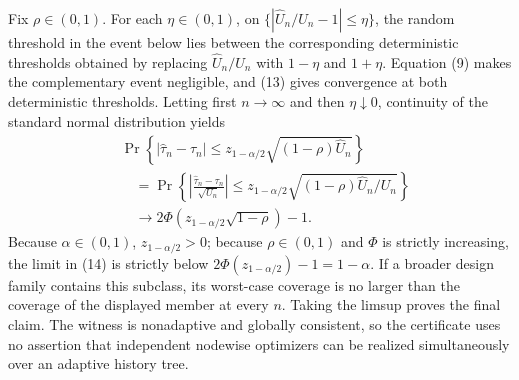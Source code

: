 Fix \(\rho\in(0,1)\).  For each \(\eta\in(0,1)\), on
\(\{|\widehat U_n/U_n-1|\le\eta\}\), the random threshold in the event
below lies between the corresponding deterministic thresholds obtained by
replacing \(\widehat U_n/U_n\) with \(1-\eta\) and \(1+\eta\).  Equation
(9) makes the complementary event negligible, and (13) gives convergence
at both deterministic thresholds.  Letting first \(n\to\infty\) and then
\(\eta\downarrow0\), continuity of the standard normal distribution yields
\[
\begin{aligned}
&\Pr\!\left\{|\widehat\tau_n-\tau_n|
\le z_{1-\alpha/2}\sqrt{(1-\rho)\widehat U_n}\right\}\\
&\quad=\Pr\!\left\{
\left|\frac{\widehat\tau_n-\tau_n}{\sqrt{U_n}}\right|
\le z_{1-\alpha/2}
\sqrt{(1-\rho)\widehat U_n/U_n}\right\}\\
&\quad\longrightarrow
2\Phi\!\left(z_{1-\alpha/2}\sqrt{1-\rho}\right)-1.
\end{aligned}
\tag{14}
\]
Because \(\alpha\in(0,1)\), \(z_{1-\alpha/2}>0\); because
\(\rho\in(0,1)\) and \(\Phi\) is strictly increasing, the limit in (14)
is strictly below
\(2\Phi(z_{1-\alpha/2})-1=1-\alpha\).  If a broader design family contains
this subclass, its worst-case coverage is no larger than the coverage of
the displayed member at every \(n\).  Taking the limsup proves the final
claim.  The witness is nonadaptive and globally consistent, so the
certificate uses no assertion that independent nodewise optimizers can be
realized simultaneously over an adaptive history tree.